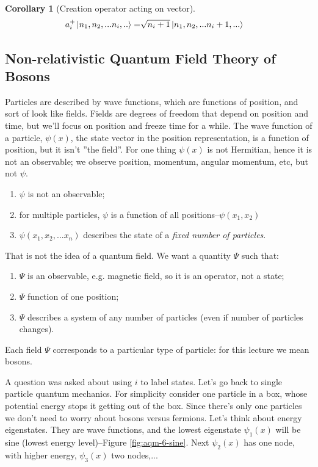 \documentclass[]{article}
\newtheorem{cor}[thm]{Corollary}
\begin{document}
\begin{cor}[Creation operator acting on vector]
	\begin{align*}
		a_i^+\ket{n_1,n_2,...n_i,..}=&\sqrt{n_i+1}\ket{n_1,n_2,...n_i+1,...}
	\end{align*}
\end{cor}

\subsection{Non-relativistic Quantum Field Theory of Bosons}

Particles are described by wave functions, which are functions of position, and sort of look like fields. Fields are degrees of freedom that depend on position and time, but we'll focus on position and freeze time for a while. The wave function of a particle, $\psi(x)$, the state vector in the position representation, is a function of position, but it isn't ''the field''. For one thing $\psi(x)$ is not Hermitian, hence it is not an observable; we observe position, momentum, angular momentum, etc, but not $\psi$.
\begin{enumerate}
	\item $\psi$ is not an observable;
	\item for multiple particles, $\psi$ is a function of all positions--$\psi(x_1,x_2)$
	\item $\psi(x_1,x_2,...x_n)$ describes the state of a \emph{fixed number of particles}.
\end{enumerate}

 That is not the idea of a quantum field. We want a quantity $\Psi$ such that:

\begin{enumerate}
	\item $\Psi$ is an observable, e.g. magnetic field, so it is an operator, not a state;
	\item $\Psi$ function of one position;
	\item $\Psi$ describes a system of any number of particles (even if number of particles changes).
\end{enumerate}

Each field $\Psi$ corresponds to a particular type of particle: for this lecture we mean bosons.

A question was asked about using $i$ to label states. Let's go back to single particle quantum mechanics. For simplicity consider one particle in a box, whose potential energy stops it getting out of the box. Since there's only one particles we don't need to worry about bosons versus fermions. Let's think about energy eigenstates. They are wave functions, and the lowest eigenstate $\psi_1(x)$ will be sine (lowest energy level)--Figure \ref{fig:aqm-6-sine}. Next $\psi_2(x)$ has one node, with higher energy, $\psi_3(x)$ two nodes,...
\end{document}
